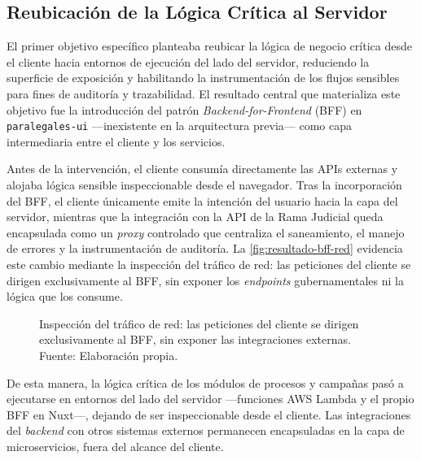 \subsection{Reubicación de la Lógica Crítica al Servidor}\label{subsec:resultado-a}

El primer objetivo específico planteaba reubicar la lógica de negocio crítica desde el cliente hacia entornos de ejecución del lado del servidor, reduciendo la superficie de exposición y habilitando la instrumentación de los flujos sensibles para fines de auditoría y trazabilidad. El resultado central que materializa este objetivo fue la introducción del patrón \textit{Backend-for-Frontend} (BFF) en \texttt{paralegales-ui} —inexistente en la arquitectura previa— como capa intermediaria entre el cliente y los servicios.

Antes de la intervención, el cliente consumía directamente las APIs externas y alojaba lógica sensible inspeccionable desde el navegador. Tras la incorporación del BFF, el cliente únicamente emite la intención del usuario hacia la capa del servidor, mientras que la integración con la API de la Rama Judicial queda encapsulada como un \textit{proxy} controlado que centraliza el saneamiento, el manejo de errores y la instrumentación de auditoría. La \autoref{fig:resultado-bff-red} evidencia este cambio mediante la inspección del tráfico de red: las peticiones del cliente se dirigen exclusivamente al BFF, sin exponer los \textit{endpoints} gubernamentales ni la lógica que los consume.

\newcommand\resultadoBffRedCaption{Inspección del tráfico de red: las peticiones del cliente se dirigen exclusivamente al BFF, sin exponer las integraciones externas. \hspace{1em}}
\begin{figure}[H]
  \centering
  \caption[\resultadoBffRedCaption]{\resultadoBffRedCaption Fuente: Elaboración propia.}
  \label{fig:resultado-bff-red}
\end{figure}

De esta manera, la lógica crítica de los módulos de procesos y campañas pasó a ejecutarse en entornos del lado del servidor —funciones AWS Lambda y el propio BFF en Nuxt—, dejando de ser inspeccionable desde el cliente. Las integraciones del \textit{backend} con otros sistemas externos permanecen encapsuladas en la capa de microservicios, fuera del alcance del cliente.
